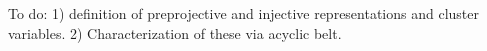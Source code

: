 \documentclass[12pt]{amsart}
\newcommand{\CC}{\mathbb{C}}
\theoremstyle{remark}
\numberwithin{equation}{section}
\begin{document}
To do: 1) definition of preprojective and injective representations and cluster variables. 2) Characterization of these via acyclic belt.
\end{document}
